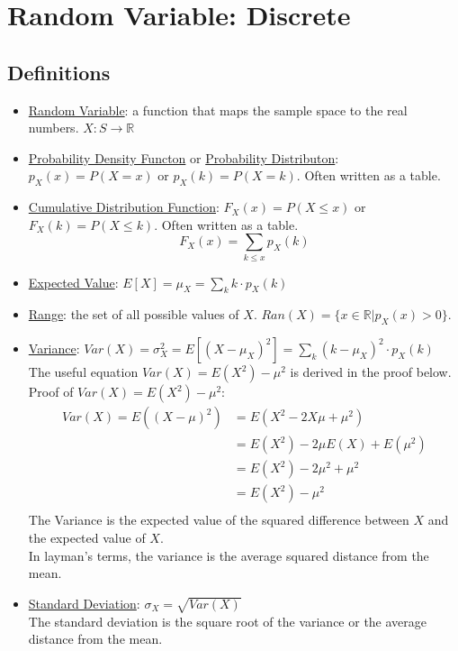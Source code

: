 \documentclass[12pt]{article}
\begin{document}
    \section{Random Variable: Discrete}
        \subsection{Definitions}
            \begin{itemize}
                \item \underline{Random Variable}: a function that maps the sample space to the real numbers. $X: S \rightarrow \mathbb{R}$
                \item \underline{Probability Density Functon} or \underline{Probability Distributon}: $p_X(x) = P(X = x)$ or $p_X(k) = P(X = k)$. Often written as a table.
                \item \underline{Cumulative Distribution Function}: $F_X(x) = P(X \leq x)$ or $F_X(k) = P(X \leq k)$. Often written as a table. \\
                \begin{equation}
                    F_X(x) = \sum_{k \leq x} p_X(k)
                \end{equation}
                \item \underline{Expected Value}: $E[X] = \mu_X = \sum_{k} k \cdot p_X(k)$
                \item \underline{Range}: the set of all possible values of $X$. $Ran(X) = \{x \in \mathbb{R} | p_X(x) > 0\}$.
                \item \underline{Variance}: $Var(X) = \sigma_X^2 = E[{(X - \mu_X)}^2] = \sum_{k} {(k - \mu_X)}^2 \cdot p_X(k)$ \\
                The useful equation $Var(X) = E(X^2) - \mu^2$ is derived in the proof below. \\
                Proof of $Var(X) = E(X^2) - \mu^2$:
                \begin{align*}
                    Var(X) = E({(X-\mu)}^2)
                    &= E(X^2 - 2X\mu + \mu^2) \\
                    &= E(X^2) - 2\mu{}E(X) + E(\mu^2) \\
                    &= E(X^2) - 2\mu^2 + \mu^2 \\
                    &= E(X^2) - \mu^2 \\
                \end{align*}
                The Variance is the expected value of the squared difference between $X$ and the expected value of $X$. \\
                In layman's terms, the variance is the average squared distance from the mean.
                \item \underline{Standard Deviation}: $\sigma_X = \sqrt{Var(X)}$ \\
                The standard deviation is the square root of the variance or the average distance from the mean.
            \end{itemize}
\end{document}
